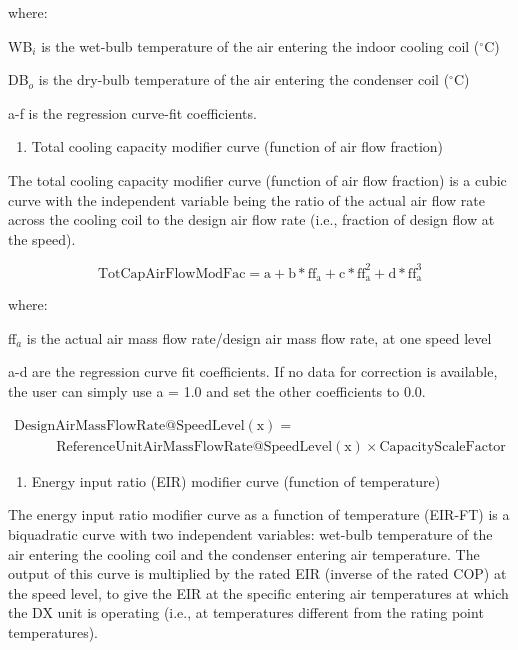 where:

WB\(_{i}\) is the wet-bulb temperature of the air entering the indoor cooling coil (\(^{\circ}\)C)

DB\(_{o}\) is the dry-bulb temperature of the air entering the condenser coil (\(^{\circ}\)C)

a-f is the regression curve-fit coefficients.

\begin{enumerate}
\def\labelenumi{\arabic{enumi})}
\setcounter{enumi}{1}
\item Total cooling capacity modifier curve (function of air flow fraction)
\end{enumerate}

The total cooling capacity modifier curve (function of air flow fraction) is a cubic curve with the independent variable being the ratio of the actual air flow rate across the cooling coil to the design air flow rate (i.e., fraction of design flow at the speed).

\begin{equation}
{\mathrm{TotCapAirFlowModFac}} = {\mathrm{a}} + {\mathrm{b*f}}{{\mathrm{f}}_{\mathrm{a}}} + {\mathrm{c*ff}}_{\mathrm{a}}^2 + {\mathrm{d*ff}}_{\mathrm{a}}^3
\end{equation}

where:

ff\(_{a}\) is the actual air mass flow rate/design air mass flow rate, at one speed level

a-d are the regression curve fit coefficients.  If no data for correction is available, the user can simply use a = 1.0 and set the other coefficients to 0.0.

\begin{equation}
  \begin{array}{l}
    {\mathrm{DesignAirMassFlowRate}}@{\mathrm{SpeedLevel}}({\mathrm{x}}) = \\\quad \quad \quad {\mathrm{ReferenceUnitAirMassFlowRate}}@{\mathrm{SpeedLevel}}({\mathrm{x}}) \times {\mathrm{CapacityScaleFactor}}
  \end{array}
\end{equation}

\begin{enumerate}
\def\labelenumi{\arabic{enumi})}
\setcounter{enumi}{2}
\tightlist
\item
  Energy input ratio (EIR) modifier curve (function of temperature)
\end{enumerate}

The energy input ratio modifier curve as a function of temperature (EIR-FT) is a biquadratic curve with two independent variables: wet-bulb temperature of the air entering the cooling coil and the condenser entering air temperature. The output of this curve is multiplied by the rated EIR (inverse of the rated COP) at the speed level, to give the EIR at the specific entering air temperatures at which the DX unit is operating (i.e., at temperatures different from the rating point temperatures).

